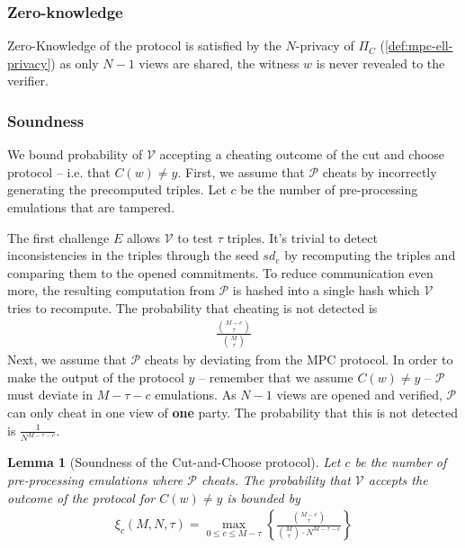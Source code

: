 \documentclass[11pt]{report}
\theoremstyle{definition}
\theoremstyle{plain}
\newtheorem{lemma}{Lemma}[section]
\begin{document}
\subsubsection{Zero-knowledge}

Zero-Knowledge of the protocol is satisfied by the $N$-privacy of $\Pi_C$ (\autoref{def:mpc-ell-privacy}) as only $N-1$ views are shared, the witness $w$ is never revealed to the verifier.

\subsubsection{Soundness}

We bound probability of $\mathcal{V}$ accepting a cheating outcome of  the cut and choose protocol -- i.e. that $C(w) \neq y$. First, we assume that $\mathcal{P}$ cheats by incorrectly generating the precomputed triples. Let $c$ be the number of pre-processing emulations that are tampered.

The first challenge $E$ allows $\mathcal{V}$ to test $\tau$ triples. It's trivial to detect inconsistencies in the triples through the seed $sd_e$ by recomputing the triples and comparing them to the opened commitments. To reduce communication even more, the resulting computation from $\mathcal{P}$ is hashed into a single hash which $\mathcal{V}$ tries to recompute. The probability that cheating is not detected is
\begin{align*}
  \frac{\binom{M-c}{\tau}}{\binom{M}{\tau}}
\end{align*}
Next, we assume that $\mathcal{P}$ cheats by deviating from the MPC protocol. In order to make the output of the protocol $y$ -- remember that we assume $C(w) \neq y$ -- $\mathcal{P}$ must deviate in $M-\tau-c$ emulations. As $N-1$ views are opened and verified, $\mathcal{P}$ can only cheat in one view of \textbf{one} party. The probability that this is not detected is $\frac{1}{N^{M-\tau-c}}$.

\begin{lemma}[Soundness of the Cut-and-Choose protocol]\label{lem:cut-and-choose-soundness}
  Let $c$ be the number of pre-processing emulations where $\mathcal{P}$ cheats. The probability that $\mathcal{V}$ accepts the outcome of the protocol for $C(w) \neq y$ is bounded by
  \begin{align*}
    \xi_c(M, N, \tau) = \max_{0 \leq c \leq M-\tau} \left\{\frac{\binom{M-c}{\tau}}{\binom{M}{\tau} \cdot N^{M-\tau-c}} \right\}
  \end{align*}
\end{lemma}
\end{document}

